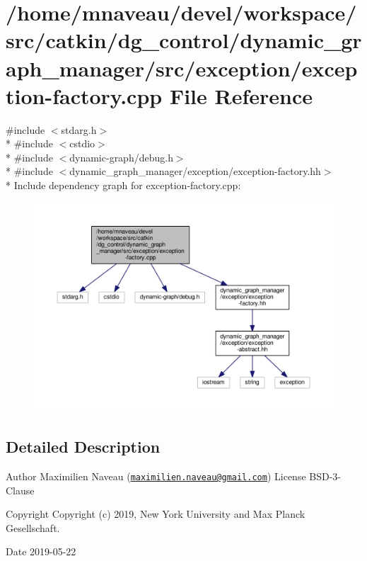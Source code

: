 \hypertarget{exception-factory_8cpp}{}\section{/home/mnaveau/devel/workspace/src/catkin/dg\+\_\+control/dynamic\+\_\+graph\+\_\+manager/src/exception/exception-\/factory.cpp File Reference}
\label{exception-factory_8cpp}
{\ttfamily \#include $<$stdarg.\+h$>$}\\*
{\ttfamily \#include $<$cstdio$>$}\\*
{\ttfamily \#include $<$dynamic-\/graph/debug.\+h$>$}\\*
{\ttfamily \#include $<$dynamic\+\_\+graph\+\_\+manager/exception/exception-\/factory.\+hh$>$}\\*
Include dependency graph for exception-\/factory.cpp\+:\nopagebreak
\begin{figure}[H]
\begin{center}
\leavevmode
\includegraphics[width=350pt]{exception-factory_8cpp__incl}
\end{center}
\end{figure}


\subsection{Detailed Description}
\begin{DoxyAuthor}{Author}
Maximilien Naveau (\href{mailto:maximilien.naveau@gmail.com}{\tt maximilien.\+naveau@gmail.\+com})  License B\+S\+D-\/3-\/\+Clause 
\end{DoxyAuthor}
\begin{DoxyCopyright}{Copyright}
Copyright (c) 2019, New York University and Max Planck Gesellschaft. 
\end{DoxyCopyright}
\begin{DoxyDate}{Date}
2019-\/05-\/22 
\end{DoxyDate}
